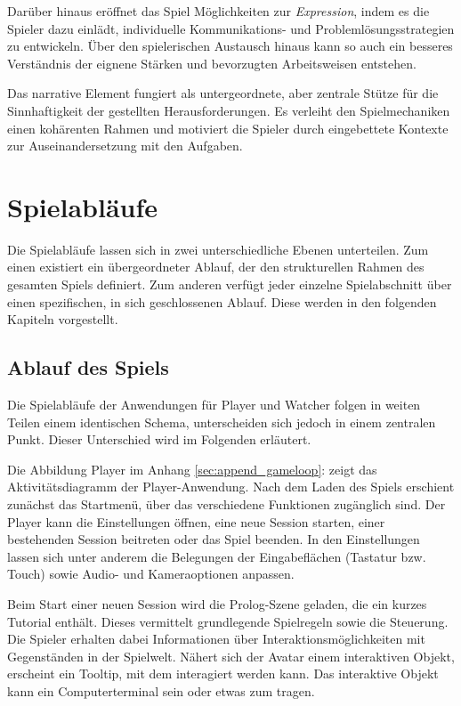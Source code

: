 Darüber hinaus eröffnet das Spiel Möglichkeiten zur \textit{Expression}, indem es die Spieler dazu einlädt, individuelle Kommunikations- und Problemlösungsstrategien zu entwickeln. Über den spielerischen Austausch hinaus kann so auch ein besseres Verständnis der eignene Stärken und bevorzugten Arbeitsweisen entstehen.

Das narrative Element fungiert als untergeordnete, aber zentrale Stütze für die Sinnhaftigkeit der gestellten Herausforderungen. Es verleiht den Spielmechaniken einen kohärenten Rahmen und motiviert die Spieler durch eingebettete Kontexte zur Auseinandersetzung mit den Aufgaben.

\section{Spielabläufe}

Die Spielabläufe lassen sich in zwei unterschiedliche Ebenen unterteilen. Zum einen existiert ein übergeordneter Ablauf, der den strukturellen Rahmen des gesamten Spiels definiert. Zum anderen verfügt jeder einzelne Spielabschnitt über einen spezifischen, in sich geschlossenen Ablauf. Diese werden in den folgenden Kapiteln vorgestellt.

\subsection{Ablauf des Spiels}

Die Spielabläufe der Anwendungen für Player und Watcher folgen in weiten Teilen einem identischen Schema, unterscheiden sich jedoch in einem zentralen Punkt. Dieser Unterschied wird im Folgenden erläutert.

Die Abbildung Player im Anhang \ref{sec:append_gameloop}:  zeigt das Aktivitätsdiagramm der Player-Anwendung. Nach dem Laden des Spiels erschient zunächst das Startmenü, über das verschiedene Funktionen zugänglich sind. Der Player kann die Einstellungen öffnen, eine neue Session starten, einer bestehenden Session beitreten oder das Spiel beenden. In den Einstellungen lassen sich unter anderem die Belegungen der Eingabeflächen (Tastatur bzw. Touch) sowie Audio- und Kameraoptionen anpassen.

Beim Start einer neuen Session wird die Prolog-Szene geladen, die ein kurzes Tutorial enthält. Dieses vermittelt grundlegende Spielregeln sowie die Steuerung. Die Spieler erhalten dabei Informationen über Interaktionsmöglichkeiten mit Gegenständen in der Spielwelt. Nähert sich der Avatar einem interaktiven Objekt, erscheint ein Tooltip, mit dem interagiert werden kann. Das interaktive Objekt kann ein Computerterminal sein oder etwas zum tragen.

